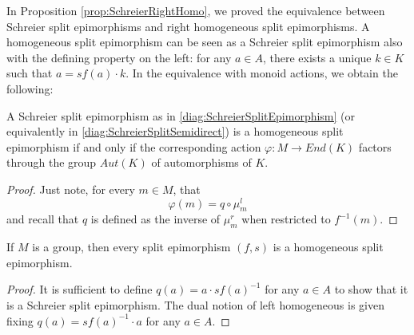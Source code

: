 In Proposition \ref{prop:SchreierRightHomo}, we proved the equivalence between Schreier split epimorphisms and right homogeneous split epimorphisms. A homogeneous split epimorphism can be seen as a Schreier split epimorphism also with the defining property on the left: for any $a\in A$, there exists a unique $k\in K$ such that $a = sf(a)\cdot k$. In the equivalence with monoid actions, we obtain the following:
\begin{proposition}
    A Schreier split epimorphism as in \eqref{diag:SchreierSplitEpimorphism} (or equivalently in \eqref{diag:SchreierSplitSemidirect}) is a homogeneous split epimorphism if and only if the corresponding action $\varphi:M\to End(K)$ factors through the group $Aut(K)$ of automorphisms of $K$.
    \begin{proof}
        Just note, for every $m\in M$, that
        \[ \varphi(m) = q\circ \mu_m^l \]
        and recall that $q$ is defined as the inverse of $\mu_m^r$ when restricted to $f^{-1}(m)$.
    \end{proof}
\end{proposition}

\begin{proposition}
\label{prop:SplitEpiInGroups}
    If $M$ is a group, then every split epimorphism $(f,s)$ is a homogeneous split epimorphism.
    \begin{proof}
        It is sufficient to define $q(a)=a\cdot {sf(a)}^{-1}$ for any $a\in A$ to show that it is a Schreier split epimorphism. The dual notion of left homogeneous is given fixing $q(a) = {sf(a)}^{-1}\cdot a$ for any $a\in A$.
    \end{proof}
\end{proposition}


